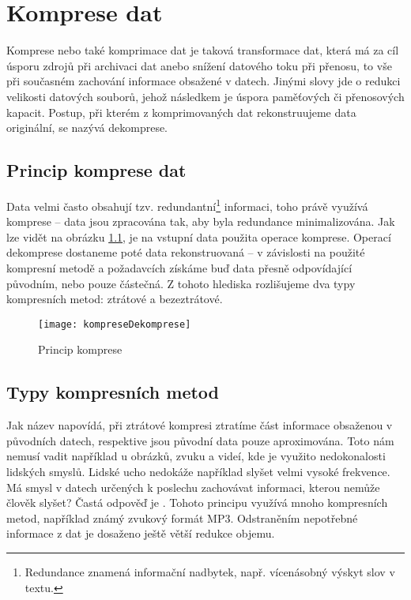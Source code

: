 \chapter{Komprese dat}
Komprese nebo také komprimace dat je taková transformace dat, která má za cíl úsporu zdrojů při archivaci dat anebo snížení datového toku při přenosu, to vše při současném zachování informace obsažené v datech. Jinými slovy jde o redukci velikosti datových souborů, jehož následkem je úspora paměťových či přenosových kapacit. Postup, při kterém z komprimovaných dat rekonstruujeme data originální, se nazývá dekomprese.

\section{Princip komprese dat}
\label{sekcePrincipKompreseDat}
Data velmi často obsahují tzv. redundantní\footnote{Redundance znamená informační nadbytek, např. vícenásobný výskyt slov v textu.} informaci, toho právě využívá komprese -- data jsou zpracována tak, aby byla redundance minimalizována. Jak lze vidět na obrázku \ref{kompreseDekomprese}, je na vstupní data použita operace komprese. Operací dekomprese dostaneme poté data rekonstruovaná -- v závislosti na použité kompresní metodě a požadavcích získáme buď data přesně odpovídající původním, nebo pouze částečná. Z tohoto hlediska rozlišujeme dva typy kompresních metod: ztrátové a bezeztrátové.

\begin{figure}[!htb]
\centering
\texttt{[image: kompreseDekomprese]}
\caption{Princip komprese}
\label{kompreseDekomprese}
\end{figure}

\section{Typy kompresních metod}
Jak název napovídá, při ztrátové kompresi ztratíme část informace obsaženou v původních datech, respektive jsou původní data pouze aproximována.  Toto nám nemusí vadit například u obrázků, zvuku a videí, kde je využito nedokonalosti lidských smyslů. Lidské ucho nedokáže například slyšet velmi vysoké frekvence. Má smysl v datech určených k poslechu zachovávat informaci, kterou nemůže člověk slyšet? Častá odpověď je . Tohoto principu využívá mnoho kompresních metod, například známý zvukový formát MP3. Odstraněním nepotřebné informace z dat je dosaženo ještě větší redukce objemu. 

